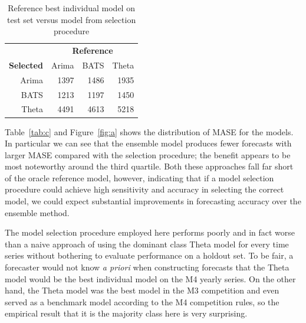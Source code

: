 \documentclass[11pt,3p,review,authoryear]{elsarticle}
\begin{document}
\begin{table}[ht]
\centering
\begin{tabular}{rrrr}
  \hline
  & \multicolumn{3}{c}{\textbf{Reference}} \\
 \textbf{Selected} & Arima & BATS & Theta  \\
 \hline
 Arima & 1397 & 1486 & 1935 \\ 
   BATS & 1213 & 1197 & 1450 \\ 
  Theta & 4491 & 4613 & 5218 \\ 
   \hline
\end{tabular}
\caption{Reference best individual model on test set versus model from selection procedure}\label{tab:b}
\end{table}

Table~\ref{tab:c} and Figure~\ref{fig:a} shows the distribution of MASE for the models. In particular we can see that the ensemble model produces fewer forecasts with larger MASE compared with the selection procedure; the benefit appears to be most noteworthy around the third quartile. Both these approaches fall far short of the oracle reference model, however, indicating that if a model selection procedure could achieve high sensitivity and accuracy in selecting the correct model, we could expect substantial improvements in forecasting accuracy over the ensemble method. 


The model selection procedure employed here performs poorly and in fact worse than a naive approach of using the dominant class Theta model for every time series without bothering to evaluate performance on a holdout set. To be fair, a forecaster would not know \textit{a priori} when constructing forecasts that the Theta model would be the best individual model on the M4 yearly series. On the other hand, the Theta model was the best model in the M3 competition and even served as a benchmark model according to the M4 competition rules, so the empirical result that it is the majority class here is very surprising.
\end{document}
